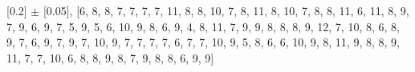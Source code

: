 
[0.2] $\pm$ [0.05], [6, 8, 8, 7, 7, 7, 7, 11, 8, 8, 10, 7, 8, 11, 8, 10, 7, 8, 8, 11, 6, 11, 8, 9, 7, 9, 6, 9, 7, 5, 9, 5, 6, 10, 9, 8, 6, 9, 4, 8, 11, 7, 9, 9, 8, 8, 8, 9, 12, 7, 10, 8, 6, 8, 9, 7, 6, 9, 7, 9, 7, 10, 9, 7, 7, 7, 7, 6, 7, 7, 10, 9, 5, 8, 6, 6, 10, 9, 8, 11, 9, 8, 8, 9, 11, 7, 7, 10, 6, 8, 8, 9, 8, 7, 9, 8, 8, 6, 9, 9]\\
    